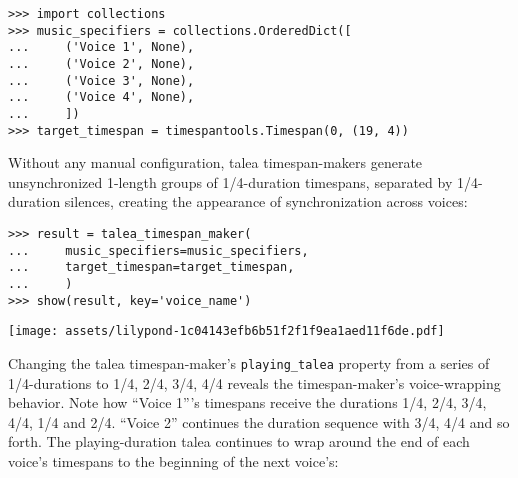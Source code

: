 \begin{abjadbookoutput}
\begin{singlespacing}
\vspace{-0.5\baselineskip}
\begin{lstlisting}
>>> import collections
>>> music_specifiers = collections.OrderedDict([
...     ('Voice 1', None),
...     ('Voice 2', None),
...     ('Voice 3', None),
...     ('Voice 4', None),
...     ])
>>> target_timespan = timespantools.Timespan(0, (19, 4))
\end{lstlisting}
\end{singlespacing}
\end{abjadbookoutput}

\noindent Without any manual configuration, talea timespan-makers generate
unsynchronized 1-length groups of 1/4-duration timespans, separated by
1/4-duration silences, creating the appearance of synchronization across
voices:

\begin{comment}
<abjad>
result = talea_timespan_maker(
    music_specifiers=music_specifiers,
    target_timespan=target_timespan,
    )
show(result, key='voice_name')
</abjad>
\end{comment}

\begin{abjadbookoutput}
\begin{singlespacing}
\vspace{-0.5\baselineskip}
\begin{lstlisting}
>>> result = talea_timespan_maker(
...     music_specifiers=music_specifiers,
...     target_timespan=target_timespan,
...     )
>>> show(result, key='voice_name')
\end{lstlisting}
\noindent\texttt{[image: assets/lilypond-1c04143efb6b51f2f1f9ea1aed11f6de.pdf]}
\end{singlespacing}
\end{abjadbookoutput}

\noindent Changing the talea timespan-maker's \texttt{playing\_talea} property
from a series of 1/4-durations to 1/4, 2/4, 3/4, 4/4 reveals the
timespan-maker's voice-wrapping behavior. Note how \enquote{Voice 1}'s
timespans receive the durations 1/4, 2/4, 3/4, 4/4, 1/4 and 2/4. \enquote{Voice
2} continues the duration sequence with 3/4, 4/4 and so forth. The
playing-duration talea continues to wrap around the end of each voice's
timespans to the beginning of the next voice's:

\begin{comment}
<abjad>
talea_timespan_maker = new(
    talea_timespan_maker,
    playing_talea=rhythmmakertools.Talea(
        counts=(1, 2, 3, 4),
        denominator=4,
        )
    )
result = talea_timespan_maker(
    music_specifiers=music_specifiers,
    target_timespan=target_timespan,
    )
show(result, key='voice_name')
</abjad>
\end{comment}

